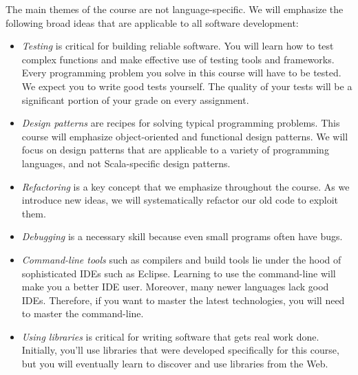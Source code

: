 \documentclass[9pt]{extbook}
\begin{document}
The main themes of the course are not language-specific. We will emphasize
the following broad ideas that are applicable to all software development:
%
\begin{itemize}

\item \emph{Testing} is critical for building reliable software. You will learn how
  to test complex functions and make effective use of testing tools and frameworks.
  Every programming problem you solve in this course will have to be tested. We
  expect you to write good tests yourself. The quality of your tests will be a
  significant portion of your grade on every assignment.

\item \emph{Design patterns} are recipes for solving typical programming
  problems. This course will emphasize object-oriented and functional
  design patterns. We will focus on design patterns that are applicable to
  a variety of programming languages, and not Scala-specific design patterns.

\item \emph{Refactoring} is a key concept that we emphasize throughout the
  course. As we introduce new ideas, we will systematically refactor our old
  code to exploit them.

\item \emph{Debugging} is a necessary skill because even small programs often
  have bugs.

\item \emph{Command-line tools} such as compilers and build tools lie under the
  hood of sophisticated IDEs such as Eclipse. Learning to use the command-line
  will make you a better IDE user. Moreover, many newer languages lack good
  IDEs. Therefore, if you want to master the latest technologies, you will
  need to master the command-line.



\item \emph{Using libraries} is critical for writing software that gets real
  work done. Initially, you'll use libraries that were developed specifically
  for this course, but you will eventually learn to discover and use
  libraries from the Web.

\end{itemize}
\end{document}
